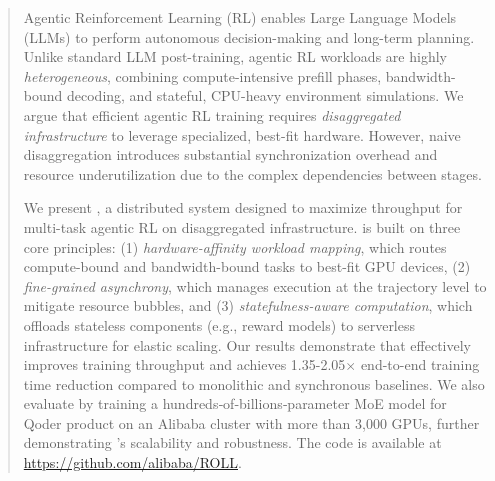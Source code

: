 \begin{abstract}
Agentic Reinforcement Learning (RL) enables Large Language Models (LLMs) to
perform autonomous decision-making and long-term planning. Unlike standard LLM
post-training, agentic RL workloads are highly \emph{heterogeneous}, combining
compute-intensive prefill phases, bandwidth-bound decoding, and stateful,
CPU-heavy environment simulations. We argue that efficient agentic RL training
requires \emph{disaggregated infrastructure} to leverage specialized, best-fit hardware.
However, naive disaggregation introduces substantial synchronization overhead
and resource underutilization due to the complex dependencies between stages.

We present \SystemName{}, a distributed system designed to maximize throughput for multi-task agentic RL on disaggregated infrastructure. \SystemName{} is built on three core principles: (1) \emph{hardware-affinity workload mapping}, which routes compute-bound and bandwidth-bound tasks to best-fit GPU devices, (2) \emph{fine-grained asynchrony}, which manages execution at the trajectory level to mitigate resource bubbles, and (3) \emph{statefulness-aware computation}, which offloads stateless components (e.g., reward models) to serverless infrastructure for elastic scaling. Our results demonstrate that \SystemName{} effectively improves training throughput and achieves 1.35-2.05\(\times\) end-to-end training time reduction compared to monolithic and synchronous baselines. We also evaluate \SystemName{} by training a hundreds‑of‑billions‑parameter MoE model for Qoder product on an Alibaba cluster with more than 3,000 GPUs, further demonstrating \SystemName{}’s scalability and robustness. The code is available at \url{https://github.com/alibaba/ROLL}.





\end{abstract}
